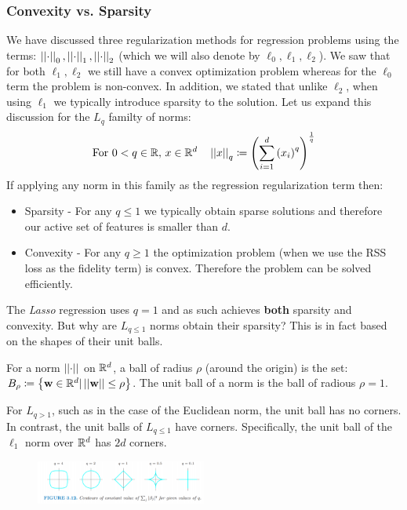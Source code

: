 

\subsubsection{Convexity vs. Sparsity}
We have discussed three regularization methods for regression problems using the terms: $\left|\left| \cdot\right|\right|_0,\left|\left| \cdot\right|\right|_1,\left|\left| \cdot\right|\right|_2$ (which we will also denote by $\ell_0,\ell_1,\ell_2$). We saw that for both $\ell_1,\ell_2$ we still have a convex optimization problem whereas for the $\ell_0$ term the problem is non-convex. In addition, we stated that unlike $\ell_2$, when using $\ell_1$ we typically introduce sparsity to the solution. Let us expand this discussion for the $L_q$ familty of norms:
\begin{equation}
\text{For } 0<q\in\mathbb{R},\,x\in\mathbb{R}^d\quad \left|\left| x\right|\right|_q\coloneqq \left(\sum_{i=1}^d \left(x_i\right)^q\right)^{\frac{1}{q}}
\label{eqn:lq_norm}
\end{equation}
If applying any norm in this family as the regression regularization term then:
\begin{itemize}
	\item Sparsity - For any $q\leq 1$ we typically obtain sparse solutions and therefore our active set of features is smaller than $d$.
	\item Convexity - For any $q\geq 1$ the optimization problem (when we use the RSS loss as the fidelity term) is convex. Therefore the problem can be solved efficiently.
\end{itemize}

The \textit{Lasso} regression uses $q=1$ and as such achieves \textbf{both} sparsity and convexity. But why are $L_{q\leq 1}$ norms obtain their sparsity? This is in fact based on the shapes of their unit balls.
\begin{definition}
For a norm $\left|\left| \cdot\right|\right|$ on $\mathbb{R}^d$, a ball of radius $\rho$ (around the origin) is the set: $B_{\rho}\coloneqq\left\{\mathbf{w}\in\mathbb{R}^d|\left|\left| \mathbf{w}\right|\right|\leq\rho\right\}$. The unit ball of a norm is the ball of radious $\rho=1$.
\end{definition}

For $L_{q>1}$, such as in the case of the Euclidean norm, the unit ball has no corners. In contrast, the unit balls of $L_{q\leq 1}$ have corners. Specifically, the unit ball of the $\ell_1$ norm over $\mathbb{R}^d$ has $2d$ corners.

\begin{figure}[!h]
	\centering
	\includegraphics[width=0.5\textwidth]{chapters/regularization.model.selection/figures/unit_balls.png}
	\caption{}
\end{figure}


